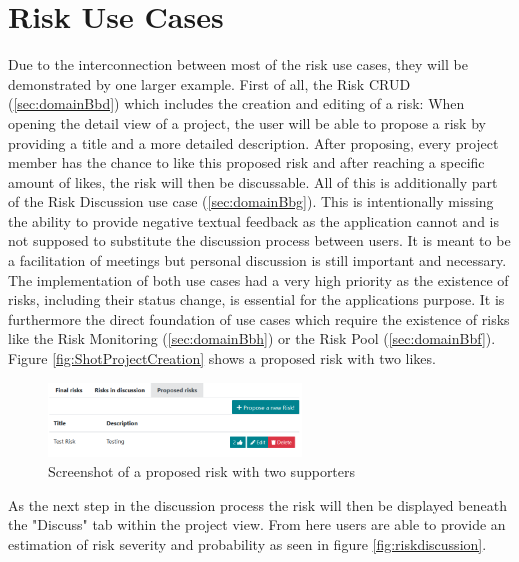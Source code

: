 
\section{Risk Use Cases}
\label{sec:implementationRisks}

Due to the interconnection between most of the risk use cases, they will be demonstrated by one larger example. First of all, the Risk CRUD (\ref{sec:domainBbd}) which includes the creation and editing of a risk: When opening the detail view of a project, the user will be able to propose a risk by providing a title and a more detailed description. After proposing, every project member has the chance to like this proposed risk and after reaching a specific amount of likes, the risk will then be discussable. All of this is additionally part of the Risk Discussion use case (\ref{sec:domainBbg}). This is intentionally missing the ability to provide negative textual feedback as the application cannot and is not supposed to substitute the discussion process between users. It is meant to be a facilitation of meetings but personal discussion is still important and necessary. The implementation of both use cases had a very high priority as the existence of risks, including their status change, is essential for the applications purpose. It is furthermore the direct foundation of use cases which require the existence of risks like the Risk Monitoring (\ref{sec:domainBbh}) or the Risk Pool (\ref{sec:domainBbf}). Figure \ref{fig:ShotProjectCreation} shows a proposed risk with two likes.

\begin{figure}[H]
	\centering
	\includegraphics[width=0.6\textwidth]{Assets/implementation_shots/proposed_risk.png}
	\caption{Screenshot of a proposed risk with two supporters}
	\label{fig:proposedrisk}
\end{figure}

As the next step in the discussion process the risk will then be displayed beneath the "Discuss" tab within the project view. From here users are able to provide an estimation of risk severity and probability as seen in figure \ref{fig:riskdiscussion}.

